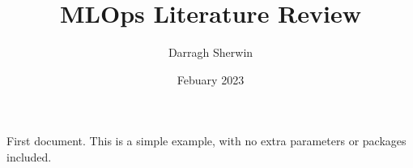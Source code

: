 \documentclass[12pt, letterpaper]{article}
\title{MLOps Literature Review}
\author{Darragh Sherwin}
\date{Febuary 2023}
\begin{document}
\maketitle
First document. This is a simple example, with no 
extra parameters or packages included.
\end{document}

